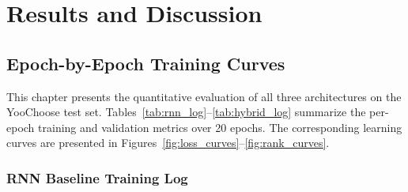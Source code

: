 \documentclass[12pt,a4paper]{report}
\begin{document}
\chapter{Results and Discussion}

\section{Epoch-by-Epoch Training Curves}

This chapter presents the quantitative evaluation of all three architectures on
the YooChoose test set. Tables~\ref{tab:rnn_log}--\ref{tab:hybrid_log} summarize
the per-epoch training and validation metrics over 20 epochs. The corresponding
learning curves are presented in Figures~\ref{fig:loss_curves}--\ref{fig:rank_curves}.

\subsection{RNN Baseline Training Log}
\end{document}
